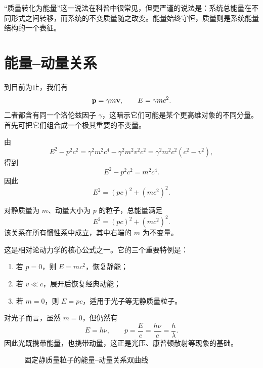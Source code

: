 \begin{remark}
“质量转化为能量”这一说法在科普中很常见，但更严谨的说法是：系统总能量在不同形式之间转移，而系统的不变质量随之改变。能量始终守恒，质量则是系统能量结构的一个表征。
\end{remark}

\section{能量--动量关系}

到目前为止，我们有
\[
\vb{p}=\gamma m\vb{v},
\qquad
E=\gamma mc^2.
\]
二者都含有同一个洛伦兹因子 $\gamma$，这暗示它们可能是某个更高维对象的不同分量。首先可把它们组合成一个极其重要的不变量。

由
\[
E^2-p^2c^2 = \gamma^2 m^2 c^4 - \gamma^2 m^2 v^2 c^2
= \gamma^2 m^2 c^2(c^2-v^2),
\]
得到
\[
E^2-p^2c^2 = m^2 c^4.
\]
因此
\[
E^2=(pc)^2+(mc^2)^2.
\]

\begin{theorem}[能量--动量关系]
对静质量为 $m$、动量大小为 $p$ 的粒子，总能量满足
\[
E^2=(pc)^2+(mc^2)^2.
\]
该关系在所有惯性系中成立，其中右端的 $m$ 为不变量。
\end{theorem}

这是相对论动力学的核心公式之一。它的三个重要特例是：
\begin{enumerate}
  \item 若 $p=0$，则 $E=mc^2$，恢复静能；
  \item 若 $v\ll c$，展开后恢复经典动能；
  \item 若 $m=0$，则 $E=pc$，适用于光子等无静质量粒子。
\end{enumerate}

对光子而言，虽然 $m=0$，但仍然有
\[
E=h\nu,
\qquad
p=\frac{E}{c}=\frac{h\nu}{c}=\frac{h}{\lambda}.
\]
因此光既携带能量，也携带动量，这正是光压、康普顿散射等现象的基础。

\begin{figure}[htbp]
\centering
{}
\caption{固定静质量粒子的能量--动量关系双曲线}
\end{figure}

